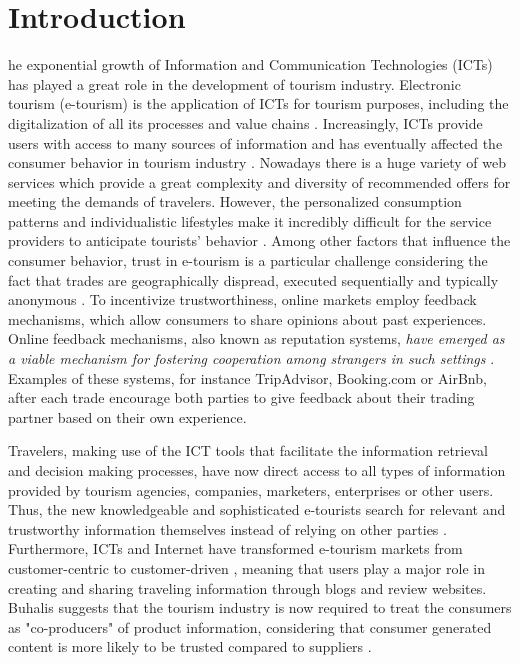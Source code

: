 %
%
\let\textcircled=\pgftextcircled
\chapter{Introduction}
\label{chap:intro}

he exponential growth of Information and Communication Technologies (ICTs) has played a great role in the development of tourism industry. Electronic tourism (e-tourism) is the application of ICTs for tourism purposes, including the digitalization of all its processes and value chains \cite{buhalis2003etourism}. Increasingly, ICTs provide users with access to many sources of information and has eventually affected the consumer behavior in tourism industry \cite{mills2004handbook}. Nowadays there is a huge variety of web services which provide a great complexity and diversity of recommended offers for meeting the demands of travelers. However, the personalized consumption patterns and individualistic lifestyles make it incredibly difficult for the service providers to anticipate tourists' behavior \cite{niemann2008enhancing}. Among other factors that influence the consumer behavior, trust in e-tourism is a particular challenge considering the fact that trades are geographically dispread, executed sequentially and  typically anonymous \cite{owen2014trust}. To incentivize trustworthiness, online markets employ feedback mechanisms, which allow consumers to share opinions about past experiences. Online feedback mechanisms, also known as reputation systems, \textit{have emerged as a viable mechanism for fostering cooperation among strangers in such settings} \cite{dellarocas2003digitization}. Examples of these systems, for instance TripAdvisor, Booking.com or AirBnb, after each trade encourage both parties to give feedback about their trading partner based on their own experience. 

Travelers, making use of the ICT tools that facilitate the information retrieval and decision making processes, have now direct access to all types of information provided by tourism agencies, companies, marketers, enterprises or other users. Thus, the new knowledgeable and sophisticated e-tourists  search for relevant and trustworthy information themselves instead of relying on other parties \cite{morrisonn2001predicting}. Furthermore, ICTs and Internet have transformed e-tourism markets from customer-centric to customer-driven \cite{buhalis2011tourism}, meaning that users play a major role in creating and sharing traveling information through blogs and review websites. Buhalis \cite{buhalis2011tourism} suggests that the tourism industry is now required to treat the consumers as "co-producers" of product information, considering that consumer generated content is more likely to be trusted compared to suppliers \cite{nielsen2009}. 

